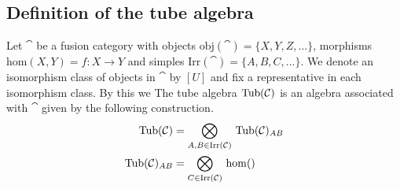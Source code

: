 \subsection{Definition of the tube algebra}

Let $\cat$ be a fusion category with objects $\mathrm{obj}(\cat)=\{X,Y,Z,...\}$, morphisms $\mathrm{hom}(X,Y)=f:X\rightarrow Y$ and simples $\mathrm{Irr}(\cat)=\{A,B,C,...\}$. We denote an isomorphism class of objects in $\cat$ by $[U]$ and fix a representative in each isomorphism class. By this we  The tube algebra $\mathrm{Tub}(\mathcal{C})$ is an algebra associated with $\cat$ given by the following construction.
\begin{align}
	\mathrm{Tub}(\mathcal{C})&=\bigotimes_{A,B\in\mathrm{Irr}(\mathcal{C})}\,\mathrm{Tub}(\mathcal{C})_{AB}\\
	\mathrm{Tub}(\mathcal{C})_{AB}&=\bigotimes_{C\in\mathrm{Irr}(\mathcal{C})}\, \mathrm{hom}()
\end{align}